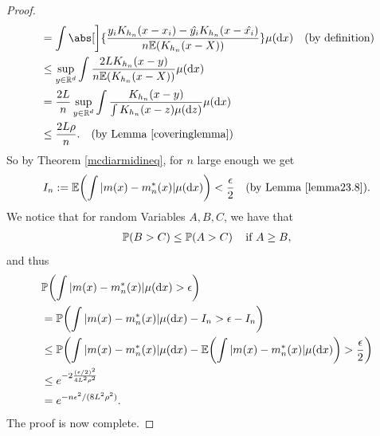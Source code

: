 \begin{proof}
\begin{align*}
        &= \int \abs[\bigg]{\frac{y_i K_{h_n}(x-x_i) - \hat{y_i} K_{h_n}(x-\hat{x_i})}{n \ev{K_{h_n}(x-X)}}} \mu(\diff{x}) \quad\text{(by definition)} \\
        &\leq \sup\limits_{y\in \R^d} \int \frac{2LK_{h_n}(x-y)}{n\ev{K_{h_n}(x-X)}} \mu(\diff{x}) \\
        &= \frac{2L}{n} \sup\limits_{y\in \R^d} \int \frac{K_{h_n}(x-y)}{\int K_{h_n}(x-z) \mu(\diff{z})} \mu(\diff{x})\\
        &\leq \frac{2L\rho}{n}. \quad\text{(by Lemma \ref{coveringlemma})}
    \end{align*}
    So by Theorem \ref{mcdiarmidineq}, for $n$ large enough we get 
    \[
        I_n := \ev{\int |m(x)-m_n^*(x)| \mu(\diff{x})} < \frac{\epsilon}{2} \quad\text{(by Lemma \ref{lemma23.8})}.
    \]
     We notice that for random Variables \(A, B, C\), we have that
    \begin{align} \label{probeq1}
        \pro{B > C} \leq \pro{A > C} \quad \text{if \(A \geq B\)},
    \end{align}
    and thus
    \begin{align*}
        &\pro{\int |m(x) - m_n^*(x)| \mu(\diff{x}) > \epsilon} \\ 
        &= \pro{\int |m(x) - m_n^*(x)| \mu(\diff{x}) - I_n > \epsilon - I_n} \\
        &\leq \pro{\int |m(x) - m_n^*(x)| \mu(\diff{x}) - \ev{\int |m(x)-m_n^*(x)| \mu(\diff{x})}  > \frac{\epsilon}{2}} \\ 
        &\leq e^{-2\frac{(\epsilon/2)^2}{4L^2\rho^2}} \\
        &= e^{-n\epsilon^2/(8L^2\rho^2)}.
    \end{align*}
    The proof is now complete.
\end{proof}

